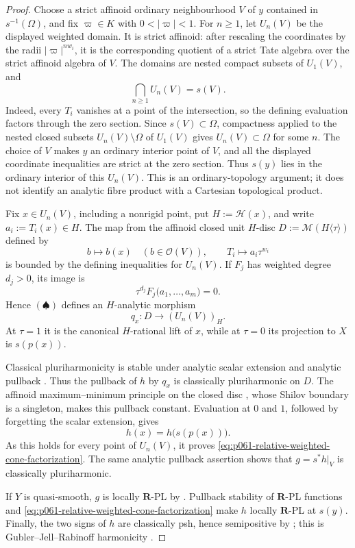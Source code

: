 \begin{proof}
Choose a strict affinoid ordinary neighbourhood \(V\) of \(y\) contained
in \(s^{-1}(\Omega)\), and fix \(\varpi\in K\) with
\(0<|\varpi|<1\).  For \(n\geq1\), let \(U_n(V)\) be the displayed
weighted domain.  It is strict affinoid: after rescaling the coordinates by
the radii \(|\varpi|^{nw_i}\), it is the corresponding quotient of a strict
Tate algebra over the strict affinoid algebra of \(V\).  The domains are
nested compact subsets of \(U_1(V)\), and
\[
 \bigcap_{n\geq1}U_n(V)=s(V).
 \tag{\(\clubsuit\)}
\]
Indeed, every \(T_i\) vanishes at a point of the intersection, so the
defining evaluation factors through the zero section.  Since
\(s(V)\subset\Omega\), compactness applied to the nested closed subsets
\(U_n(V)\setminus\Omega\) of \(U_1(V)\) gives \(U_n(V)\subset\Omega\)
for some \(n\).  The choice of \(V\) makes \(y\) an ordinary interior
point of \(V\), and all the displayed coordinate inequalities are strict at
the zero section.  Thus \(s(y)\) lies in the ordinary interior of this
\(U_n(V)\).  This is an ordinary-topology argument; it does not identify an
analytic fibre product with a Cartesian topological product.

Fix \(x\in U_n(V)\), including a nonrigid point, put
\(H:=\mathscr H(x)\), and write \(a_i:=T_i(x)\in H\).  The map from the
affinoid closed unit \(H\)-disc \(D:=\mathcal M(H\langle\tau\rangle)\)
defined by
\[
 b\longmapsto b(x)\quad(b\in\mathcal O(V)),
 \qquad T_i\longmapsto a_i\tau^{w_i}
 \tag{\(\spadesuit\)}
\]
is bounded by the defining inequalities for \(U_n(V)\).  If \(F_j\) has
weighted degree \(d_j>0\), its image is
\[
 \tau^{d_j}F_j\bigl(a_1,\ldots,a_m\bigr)=0.
\]
Hence \((\spadesuit)\) defines an \(H\)-analytic morphism
\[
q_x:D\longrightarrow (U_n(V))_H.
\]
At \(\tau=1\) it is the canonical \(H\)-rational lift of \(x\), while at
\(\tau=0\) its projection to \(X\) is \(s(p(x))\).

Classical pluriharmonicity is stable under analytic scalar extension and
analytic pullback \cite[Proposition~7.2(6),(7)]{GR25Classical}.  Thus the
pullback of \(h\) by \(q_x\) is classically pluriharmonic on \(D\).  The
affinoid maximum--minimum principle on the closed disc
\cite[Proposition~7.3]{GR25Classical}, whose Shilov boundary is a singleton,
makes this pullback constant.  Evaluation at \(0\) and \(1\), followed by
forgetting the scalar extension, gives
\[
 h(x)=h\bigl(s(p(x))\bigr).
\]
As this holds for every point of \(U_n(V)\), it proves
\eqref{eq:p061-relative-weighted-cone-factorization}.  The same analytic
pullback assertion shows that \(g=s^*h|_V\) is classically
pluriharmonic.

If \(Y\) is quasi-smooth, \(g\) is locally \(\mathbf R\)-PL by
.  Pullback stability of
\(\mathbf R\)-PL functions \cite[Lemma~5.4(1)]{GJR26} and
\eqref{eq:p061-relative-weighted-cone-factorization} make \(h\) locally
\(\mathbf R\)-PL at \(s(y)\).  Finally, the two signs of \(h\) are
classically psh, hence semipositive by \cite[Theorem~4.3]{GR25Classical};
this is Gubler--Jell--Rabinoff harmonicity
\cite[Definition~7.2]{GJR26}.
\end{proof}
